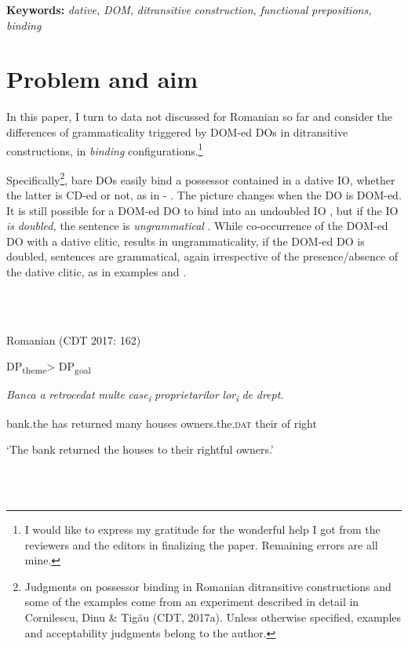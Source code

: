 \documentclass[output=paper,modfonts,nonflat]{langsci/langscibook}
\begin{document}
\textbf{Keywords:} \textit{dative,} \textit{DOM,} \textit{ditransitive} \textit{construction,} \textit{functional} \textit{prepositions,} \textit{binding}

\section{Problem and aim} %

In this paper, I turn to data not discussed for Romanian so far and consider the differences of grammaticality triggered by DOM-ed DOs in ditransitive constructions, in \textit{binding} configurations.\footnote{I would like to express my gratitude for the wonderful help I got from the reviewers and the editors in finalizing the paper. Remaining errors are all mine.}

Specifically\footnote{Judgments on possessor binding in Romanian ditransitive constructions and some of the examples come from an experiment described in detail in Cornilescu, Dinu \& Tigău (CDT, 2017a). Unless otherwise specified, examples and acceptability judgments belong to the author.}, bare DOs easily bind a possessor contained in a dative IO, whether the latter is CD-ed or not, as in  - . The picture changes when the DO is DOM-ed. It is still possible for a DOM-ed DO to bind into an undoubled IO , but if the IO \textit{is} \textit{doubled,} the sentence is \textit{ungrammatical} . While co-occurrence of the DOM-ed DO with a dative clitic, results in ungrammaticality, if the DOM-ed \textsc{DO} is doubled, sentences are grammatical, again irrespective of the presence/absence of the dative clitic, as in examples  and .

\ea%
    \label{ex:key:1}
    \gll\\
        \\
    \glt
    \z

          Romanian (CDT 2017: 162)

  DP\textsubscript{theme}> DP\textsubscript{goal}

\textit{Banca}  \textit{a} \textit{retrocedat}  \textit{multe} \textit{case\textsubscript{i}}  \textit{proprietarilor}     \textit{lor\textsubscript{i}}  \textit{de} \textit{drept.}

bank.the has returned  many houses  owners.the.\textsc{dat}    their  of right

‘The bank returned the houses to their rightful owners.’

\ea%
    \label{ex:key:2}
    \gll\\
        \\
    \glt
    \z
\end{document}
